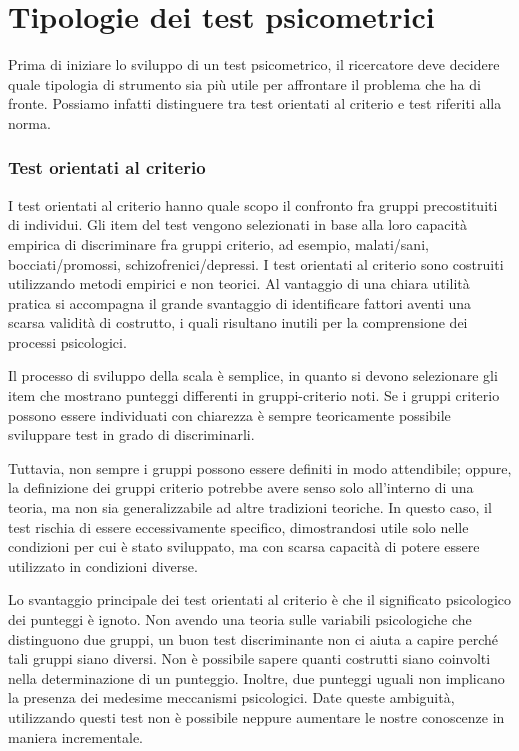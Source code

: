 \documentclass[
  11pt,
]{krantz}
\theoremstyle{definition}
\theoremstyle{definition}
\theoremstyle{definition}
\theoremstyle{definition}
\theoremstyle{remark}
\begin{document}
\hypertarget{ch:problema}{%
\chapter{Tipologie dei test psicometrici}\label{ch:problema}}

Prima di iniziare lo sviluppo di un test psicometrico, il ricercatore deve decidere quale tipologia di strumento sia più utile per affrontare il problema che ha di fronte. Possiamo infatti distinguere tra test orientati al criterio e test riferiti alla norma.

\hypertarget{test-orientati-al-criterio}{%
\subsection{Test orientati al criterio}\label{test-orientati-al-criterio}}

I test orientati al criterio hanno quale scopo il confronto fra gruppi precostituiti di individui. Gli item del test vengono selezionati in base alla loro capacità empirica di discriminare fra gruppi criterio, ad esempio, malati/sani, bocciati/promossi, schizofrenici/depressi. I test orientati al criterio sono costruiti utilizzando metodi empirici e non teorici. Al vantaggio di una chiara utilità pratica si accompagna il grande svantaggio di identificare fattori aventi una scarsa validità di costrutto, i quali risultano inutili per la comprensione dei processi psicologici.

Il processo di sviluppo della scala è semplice, in quanto si devono selezionare gli item che mostrano punteggi differenti in gruppi-criterio noti. Se i gruppi criterio possono essere individuati con chiarezza è sempre teoricamente possibile sviluppare test in grado di discriminarli.

Tuttavia, non sempre i gruppi possono essere definiti in modo attendibile; oppure, la definizione dei gruppi criterio potrebbe avere senso solo all'interno di una teoria, ma non sia generalizzabile ad altre tradizioni teoriche. In questo caso, il test rischia di essere eccessivamente specifico, dimostrandosi utile solo nelle condizioni per cui è stato sviluppato, ma con scarsa capacità di potere essere utilizzato in condizioni diverse.

Lo svantaggio principale dei test orientati al criterio è che il significato psicologico dei punteggi è ignoto. Non avendo una teoria sulle variabili psicologiche che distinguono due gruppi, un buon test discriminante non ci aiuta a capire perché tali gruppi siano diversi. Non è possibile sapere quanti costrutti siano coinvolti nella determinazione di un punteggio. Inoltre, due punteggi uguali non implicano la presenza dei medesime meccanismi psicologici. Date queste ambiguità, utilizzando questi test non è possibile neppure aumentare le nostre conoscenze in maniera incrementale.
\end{document}
